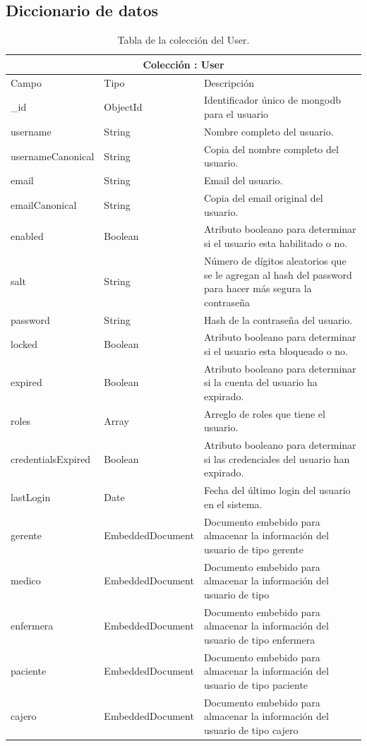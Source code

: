 	\subsection{Diccionario de datos}
	\begin{table}[htb]
	\centering
	\begin{tabular}{| p{3.5cm}| p{3.0cm} | p{9.8cm} |}
	\hline
	\multicolumn{3}{|c|}{Colección : User} \\
	\hline
	Campo & Tipo &  Descripción\\ \hline
	\_id & ObjectId & Identificador único de mongodb para el usuario \\ \hline
	username & String & Nombre completo del usuario.\\ \hline
	usernameCanonical & String & Copia del nombre completo del usuario.\\ \hline
	email & String & Email del usuario.\\ \hline
	emailCanonical & String & Copia del email original del usuario.\\ \hline
	enabled & Boolean & Atributo booleano para determinar si el usuario esta habilitado o no.\\ \hline
	salt & String & Número de dígitos aleatorios que se le agregan al hash del password para hacer más segura la contraseña \\ \hline
	password & String & Hash de la contraseña del usuario.\\ \hline
	locked & Boolean & Atributo booleano para determinar si el usuario esta bloqueado o no.\\ \hline
	expired & Boolean & Atributo booleano para determinar si la cuenta del usuario ha expirado. \\ \hline
	roles & Array & Arreglo de roles que tiene el usuario. \\ \hline
	credentialsExpired & Boolean & Atributo booleano para determinar si las credenciales del usuario han expirado. \\ \hline
	lastLogin & Date & Fecha del último login del usuario en el sistema. \\ \hline
	gerente & EmbeddedDocument & Documento embebido para almacenar la información del usuario de tipo gerente \\ \hline
	medico & EmbeddedDocument & Documento embebido para almacenar la información del usuario de tipo \\ \hline
	enfermera & EmbeddedDocument & Documento embebido para almacenar la información del usuario de tipo enfermera \\ \hline
	paciente & EmbeddedDocument & Documento embebido para almacenar la información del usuario de tipo paciente \\ \hline
	cajero & EmbeddedDocument & Documento embebido para almacenar la información del usuario de tipo cajero \\ \hline
	\end{tabular}
	\caption{Tabla de la colección del User.}
	\label{tabla:diccionarioDatos}
	\end{table}
